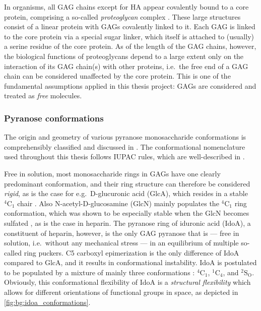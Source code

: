 In organisms, all GAG chains except for HA  appear covalently bound to a core
protein, comprising a so-called \textit{proteoglycan} complex
\cite{essentials_glycobiology_gags_chapter_2009}. These large structures consist
of a linear protein with GAGs covalently linked to it. Each GAG is linked to the
core protein via a special sugar linker, which itself is attached to (usually) a
serine residue of the core protein. As of the length of the GAG chains, however,
the biological functions of proteoglycans depend to a large extent only on the
interaction of its GAG chain(s) with other proteins, i.e.\ the free end of a GAG
chain can be considered unaffected by the core protein. This is one of the
fundamental assumptions applied in this thesis project: GAGs are considered and
treated as \textit{free} molecules.




\subsubsection{Pyranose conformations}
\label{background:gags:conformations}

The origin and geometry of various pyranose monosaccharide conformations is
comprehensibly classified and discussed in
\cite{classification_pyranose_conformers_1960}. The conformational nomenclature
used throughout this thesis follows IUPAC rules, which are well-described in
\cite{iupac_gag_conformations_1980}.

Free in solution, most monosaccharide rings in GAGs have one clearly predominant
conformation, and their ring structure can therefore be considered
\textit{rigid}, as is the case for e.g.\ D-glucuronic acid (GlcA), which resides
in a stable ${}^{4}\mathrm{C}_1$ chair \cite{almond_jacs_2010}. Also
N-acetyl-D-glucosamine (GlcN) mainly populates the ${}^{4}\mathrm{C}_1$ ring
conformation, which was shown to be especially stable when the GlcN becomes
sulfated \cite{Sattelle_glcnac_right_chair_2011}, as is the case in heparin. The
pyranose ring of iduronic acid (IdoA), a constituent of heparin, however, is the
only GAG pyranose that is --- free in solution, i.e.\ without any mechanical
stress --- in an equilibrium of multiple so-called ring puckers. C5 carboxyl
epimerization is the only difference of IdoA compared to GlcA, and it results in
conformational instability. IdoA is postulated to be populated by a mixture of
mainly three conformations \cite{almond_jacs_2010}: ${}^{4}\mathrm{C}_1$,
${}^{1}\mathrm{C}_4$, and ${}^{2}\mathrm{S}_\mathrm{O}$. Obviously, this
conformational flexibility of IdoA is a \textit{structural flexibility} which
allows for different orientations of functional groups in space, as depicted in
\cref{fig:bg:idoa_conformations}.

